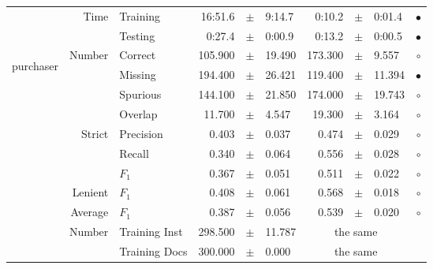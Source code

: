 \begin{longtable}{|r|r|l||rcl|rcl|c|}
\cline{2-10} & \multirow{2}{*}{      Time} &        Training &     16:51.6 &  $\pm$  &      9:14.7 &      0:10.2 &  $\pm$  &      0:01.4 & $\bullet$ \\
\cline{3-10} &                             &         Testing &      0:27.4 &  $\pm$  &      0:00.9 &      0:13.2 &  $\pm$  &      0:00.5 & $\bullet$ \\
\hline
\hline
\multirow{11}{*}{\begin{sideways}purchaser\end{sideways} }
             & \multirow{4}{*}{    Number} &         Correct &     105.900 &  $\pm$  &      19.490 &     173.300 &  $\pm$  &       9.557 & $\circ$ \\
\cline{3-10} &                             &         Missing &     194.400 &  $\pm$  &      26.421 &     119.400 &  $\pm$  &      11.394 & $\bullet$ \\
\cline{3-10} &                             &        Spurious &     144.100 &  $\pm$  &      21.850 &     174.000 &  $\pm$  &      19.743 & $\circ$ \\
\cline{3-10} &                             &         Overlap &      11.700 &  $\pm$  &       4.547 &      19.300 &  $\pm$  &       3.164 & $\circ$ \\
\cline{2-10} & \multirow{3}{*}{    Strict} &       Precision &       0.403 &  $\pm$  &       0.037 &       0.474 &  $\pm$  &       0.029 & $\circ$ \\
\cline{3-10} &                             &          Recall &       0.340 &  $\pm$  &       0.064 &       0.556 &  $\pm$  &       0.028 & $\circ$ \\
\cline{3-10} &                             &           $F_1$ &       0.367 &  $\pm$  &       0.051 &       0.511 &  $\pm$  &       0.022 & $\circ$ \\
\cline{2-10} &                     Lenient &           $F_1$ &       0.408 &  $\pm$  &       0.061 &       0.568 &  $\pm$  &       0.018 & $\circ$ \\
\cline{2-10} &                     Average &           $F_1$ &       0.387 &  $\pm$  &       0.056 &       0.539 &  $\pm$  &       0.020 & $\circ$ \\
\cline{2-10} & \multirow{2}{*}{    Number} &   Training Inst &     298.500 &  $\pm$  &      11.787 &    \multicolumn{3}{c|}{the same}         &  \\
\cline{3-10} &                             &   Training Docs &     300.000 &  $\pm$  &       0.000 &    \multicolumn{3}{c|}{the same}         &  \\

\end{longtable}
